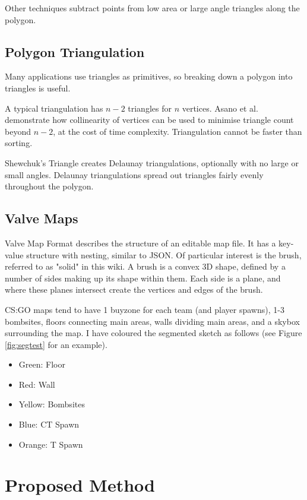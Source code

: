 \documentclass[11pt]{IEEEtran}
\begin{document}
Other techniques subtract points from low area or large angle triangles along the polygon.

\subsection{Polygon Triangulation}

Many applications use triangles as primitives, so breaking down a polygon into triangles is useful.

A typical triangulation has $n-2$ triangles for $n$ vertices. Asano et al. \cite{asano1986polygon} demonstrate how collinearity of vertices can be used to minimise triangle count beyond $n-2$, at the cost of time complexity. Triangulation cannot be faster than sorting. 

Shewchuk's Triangle \cite{shewchuk2005two} creates Delaunay triangulations, optionally with no large or small angles. Delaunay triangulations spread out triangles fairly evenly throughout the polygon.

\subsection{Valve Maps}

Valve Map Format \cite{valve2006vmf} describes the structure of an editable map file. It has a key-value structure with nesting, similar to JSON. Of particular interest is the brush, referred to as "solid" in this wiki. A brush is a convex 3D shape, defined by a number of sides making up its shape within them. Each side is a plane, and where these planes intersect create the vertices and edges of the brush.

CS:GO maps tend to have 1 buyzone for each team (and player spawns), 1-3 bombsites, floors connecting main areas, walls dividing main areas, and a skybox surrounding the map. I have coloured the segmented sketch as follows (see Figure \ref{fig:segtest} for an example).
\begin{itemize}
\item Green: Floor
\item Red: Wall
\item Yellow: Bombsites
\item Blue: CT Spawn
\item Orange: T Spawn
\end{itemize}

\section{Proposed Method}
\end{document}
